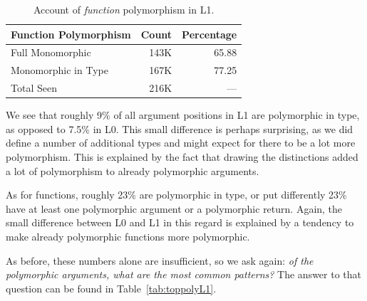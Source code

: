 \documentclass[acmsmall,10pt,review,anonymous]{acmart}\settopmatter{printfolios=true,printccs=false,printacmref=false}
\begin{document}
\begin{table}[ht]
\label{tab:funcountsL1}
\centering
\begin{tabular}{lrr}
  \hline
 Function Polymorphism & Count & Percentage \\ 
  \hline
  Full Monomorphic & 143K & 65.88 \\ 
  Monomorphic in Type & 167K & 77.25 \\ 
  Total Seen & 216K & --- \\ 
   \hline
\end{tabular}
\caption{Account of {\it function} polymorphism in L1.}
\end{table}


We see that roughly 9\% of all argument positions in L1 are polymorphic in type, as opposed to 7.5\% in L0.
This small difference is perhaps surprising, as we did define a number of additional types and might expect for there to be a lot more polymorphism.
This is explained by the fact that drawing the distinctions added a lot of polymorphism to already polymorphic arguments.

As for functions, roughly 23\% are polymorphic in type, or put differently 23\% have at least one polymorphic argument or a polymorphic return.
Again, the small difference between L0 and L1 in this regard is explained by a tendency to make already polymorphic functions more polymorphic.

As before, these numbers alone are insufficient, so we ask again: {\it of the polymorphic arguments, what are the most common patterns?}
The answer to that question can be found in Table~\ref{tab:toppolyL1}.
\end{document}

